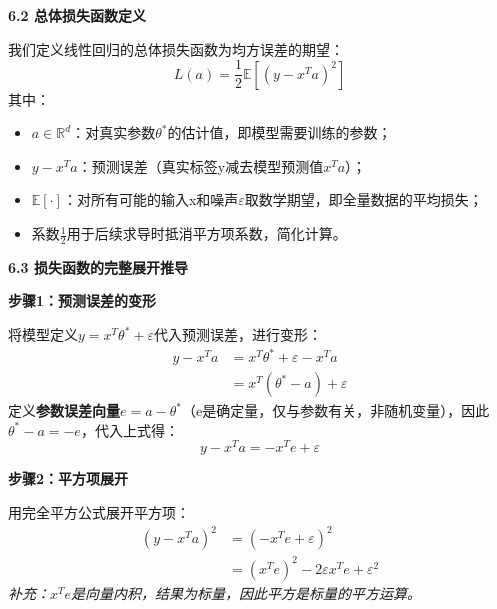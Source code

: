 \documentclass[10pt]{article}
\numberwithin{equation}{section}
\theoremstyle{plain}
\theoremstyle{definition}
\theoremstyle{remark}
\begin{document}
{\par\vspace{0.8ex}\noindent\normalsize\bfseries\color{secblue} 6.2 总体损失函数定义\par}
我们定义线性回归的总体损失函数为均方误差的期望：
\[ L(a) = \frac{1}{2} \mathbb{E}\left[ (y - x^T a)^2 \right] \]
其中：
\begin{itemize}[leftmargin=*,nosep]
    \item $a \in \mathbb{R}^d$：对真实参数$\theta^*$的估计值，即模型需要训练的参数；
    \item $y - x^T a$：预测误差（真实标签y减去模型预测值$x^T a$）；
    \item $\mathbb{E}[\cdot]$：对所有可能的输入x和噪声$\varepsilon$取数学期望，即全量数据的平均损失；
    \item 系数$\frac{1}{2}$用于后续求导时抵消平方项系数，简化计算。
\end{itemize}

{\par\vspace{0.8ex}\noindent\normalsize\bfseries\color{secblue} 6.3 损失函数的完整展开推导\par}
{\par\vspace{0.8ex}\noindent\normalsize\bfseries\color{secblue} 步骤1：预测误差的变形\par}
将模型定义$y = x^T \theta^* + \varepsilon$代入预测误差，进行变形：
\[
\begin{aligned}
y - x^T a &= x^T \theta^* + \varepsilon - x^T a \\
&= x^T (\theta^* - a) + \varepsilon
\end{aligned}
\]
定义\textbf{参数误差向量}$e = a - \theta^*$（e是确定量，仅与参数有关，非随机变量），因此$\theta^* - a = -e$，代入上式得：
\[ y - x^T a = -x^T e + \varepsilon \]

{\par\vspace{0.8ex}\noindent\normalsize\bfseries\color{secblue} 步骤2：平方项展开\par}
用完全平方公式展开平方项：
\[
\begin{aligned}
(y - x^T a)^2 &= (-x^T e + \varepsilon)^2 \\
&= (x^T e)^2 - 2 \varepsilon x^T e + \varepsilon^2
\end{aligned}
\]
\textit{补充：$x^T e$是向量内积，结果为标量，因此平方是标量的平方运算。}
\end{document}
